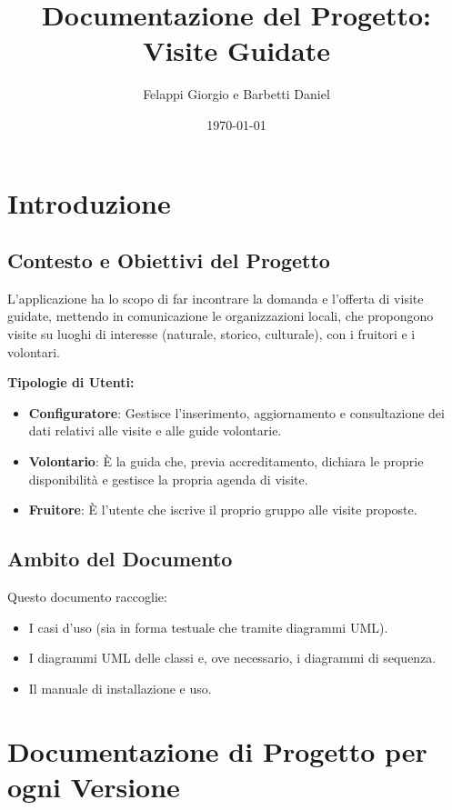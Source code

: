 \documentclass[a4paper,12pt]{article}
\title{Documentazione del Progetto: Visite Guidate}
\author{Felappi Giorgio e Barbetti Daniel}
\date{\today}
\begin{document}
\maketitle
\tableofcontents
\newpage

\section{Introduzione}

\subsection{Contesto e Obiettivi del Progetto}
L'applicazione ha lo scopo di far incontrare la domanda e l'offerta di visite guidate, mettendo in comunicazione le organizzazioni locali, che propongono visite su luoghi di interesse (naturale, storico, culturale), con i fruitori e i volontari.

\bigskip %
\textbf{Tipologie di Utenti:}
\begin{itemize}
    \item \textbf{Configuratore}: Gestisce l'inserimento, aggiornamento e consultazione dei dati relativi alle visite e alle guide volontarie.
    \item \textbf{Volontario}: È la guida che, previa accreditamento, dichiara le proprie disponibilità e gestisce la propria agenda di visite.
    \item \textbf{Fruitore}: È l'utente che iscrive il proprio gruppo alle visite proposte.
\end{itemize}

\subsection{Ambito del Documento}
Questo documento raccoglie:
\begin{itemize}
    \item I casi d'uso (sia in forma testuale che tramite diagrammi UML).
    \item I diagrammi UML delle classi e, ove necessario, i diagrammi di sequenza.
    \item Il manuale di installazione e uso.
\end{itemize}

\newpage
\section{Documentazione di Progetto per ogni Versione}
\end{document}
